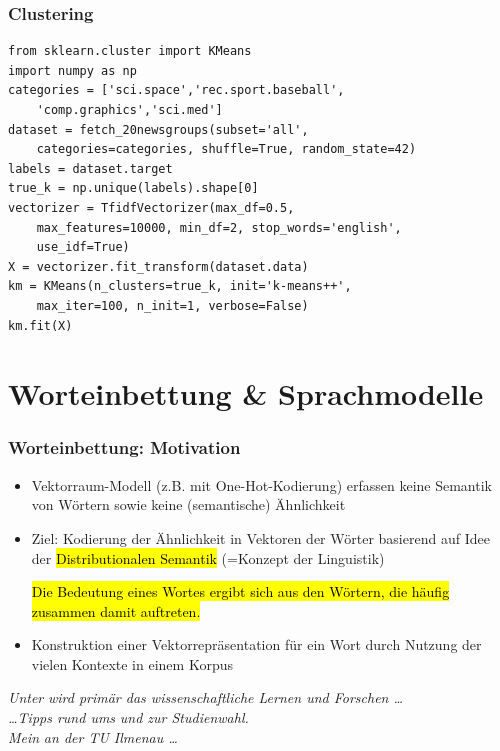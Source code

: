 
\begin{frame}[fragile]
    \frametitle{Clustering}

    \begin{verbatim}
from sklearn.cluster import KMeans
import numpy as np
categories = ['sci.space','rec.sport.baseball',
    'comp.graphics','sci.med']
dataset = fetch_20newsgroups(subset='all', 
    categories=categories, shuffle=True, random_state=42)
labels = dataset.target
true_k = np.unique(labels).shape[0]
vectorizer = TfidfVectorizer(max_df=0.5,
    max_features=10000, min_df=2, stop_words='english', 
    use_idf=True)
X = vectorizer.fit_transform(dataset.data)
km = KMeans(n_clusters=true_k, init='k-means++',
    max_iter=100, n_init=1, verbose=False)
km.fit(X)
    \end{verbatim}
\end{frame}
    
    
 
    
\section{Worteinbettung \& Sprachmodelle}


\begin{frame}
    \frametitle{Worteinbettung: Motivation}

    \begin{itemize}
\item Vektorraum-Modell (z.B. mit One-Hot-Kodierung) erfassen keine Semantik von Wörtern sowie keine (semantische) Ähnlichkeit 
\item Ziel: Kodierung der Ähnlichkeit in Vektoren der Wörter basierend auf Idee der \hl{Distributionalen Semantik} (=Konzept der Linguistik)

\hl{Die Bedeutung eines Wortes ergibt sich aus den Wörtern, die häufig zusammen damit auftreten.}

\item Konstruktion einer Vektorrepräsentation für ein Wort durch Nutzung der vielen Kontexte in einem Korpus
    \end{itemize}

    {\small
    \begin{tabbing}
    \emph{Unter}  \emph{wird primär das wissenschaftliche Lernen und Forschen \dots} \\
    \emph{\dots Tipps rund ums}  \emph{und zur Studienwahl.} \\
    \emph{Mein}  \emph{an der TU Ilmenau \dots}
    \end{tabbing}}
\end{frame}

